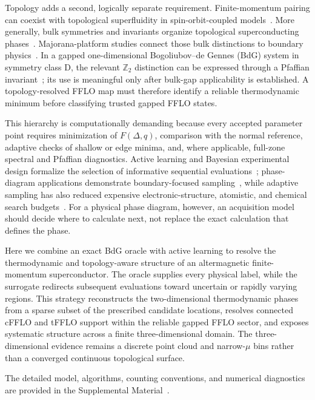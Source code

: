 Topology adds a second, logically separate requirement. Finite-momentum pairing can coexist with topological superfluidity in spin-orbit-coupled models~\cite{ZhangYi2013,QuEtAl2013,CaoEtAl2014}. More generally, bulk symmetries and invariants organize topological superconducting phases~\cite{ReadGreen2000,SatoAndo2017,QiZhang2011,SchnyderEtAl2008,RyuEtAl2010}. Majorana-platform studies connect those bulk distinctions to boundary physics~\cite{LutchynSauDasSarma2010,OregRefaelVonOppen2010,Alicea2012,Beenakker2013}. In a gapped one-dimensional Bogoliubov--de Gennes (BdG) system in symmetry class D, the relevant $\mathbb Z_2$ distinction can be expressed through a Pfaffian invariant~\cite{Kitaev2001,BudichArdonne2013}; its use is meaningful only after bulk-gap applicability is established. A topology-resolved FFLO map must therefore identify a reliable thermodynamic minimum before classifying trusted gapped FFLO states.

This hierarchy is computationally demanding because every accepted parameter point requires minimization of $F(\Delta,q)$, comparison with the normal reference, adaptive checks of shallow or edge minima, and, where applicable, full-zone spectral and Pfaffian diagnostics. Active learning and Bayesian experimental design formalize the selection of informative sequential evaluations~\cite{CohnAtlasLadner1994,MacKay1992,ShahriariEtAl2016}; phase-diagram applications demonstrate boundary-focused sampling~\cite{TerayamaEtAl2019,DaiBrussGlotzer2020,LookmanEtAl2019}, while adaptive sampling has also reduced expensive electronic-structure, atomistic, and chemical search budgets~\cite{TranUlissi2018,PodryabinkinShapeev2017,JinnouchiEtAl2019,VandermauseEtAl2020,BatraEtAl2021,NoeEtAl2019}. For a physical phase diagram, however, an acquisition model should decide where to calculate next, not replace the exact calculation that defines the phase.

Here we combine an exact BdG oracle with active learning to resolve the thermodynamic and topology-aware structure of an altermagnetic finite-momentum superconductor.  The oracle supplies every physical label, while the surrogate redirects subsequent evaluations toward uncertain or rapidly varying regions.  This strategy reconstructs the two-dimensional thermodynamic phases from a sparse subset of the prescribed candidate locations, resolves connected cFFLO and tFFLO support within the reliable gapped FFLO sector, and exposes systematic structure across a finite three-dimensional domain.  The three-dimensional evidence remains a discrete point cloud and narrow-$\mu$ bins rather than a converged continuous topological surface.

The detailed model, algorithms, counting conventions, and numerical diagnostics are provided in the Supplemental Material~\cite{SupplementalMaterial}.
